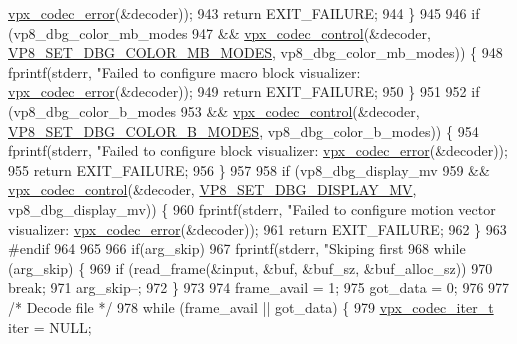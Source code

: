 \begin{DoxyCodeInclude}
{{{{{{{{{{{{{{{{{{{{{{{{{{{{{{{{{      \hyperlink{group__codec_ga4d265df00d42b36a4f0e3eb83fc22c5e}{vpx\_codec\_error}(&decoder));
943     \textcolor{keywordflow}{return} EXIT\_FAILURE;
944   \}
945 
946   \textcolor{keywordflow}{if} (vp8\_dbg\_color\_mb\_modes
947       && \hyperlink{group__codec_gac1b91e04698c1bd4c0a2b8aa85b08cd2}{vpx\_codec\_control}(&decoder, \hyperlink{group__vp8_gga8cadbc8e0af3da96ef7a2dbd4ed06599aa0d5c3eaa7cbecaf64403edc8450b060}{VP8\_SET\_DBG\_COLOR\_MB\_MODES},
       vp8\_dbg\_color\_mb\_modes)) \{
948     fprintf(stderr, \textcolor{stringliteral}{"Failed to configure macro block visualizer: %
      \hyperlink{group__codec_ga4d265df00d42b36a4f0e3eb83fc22c5e}{vpx\_codec\_error}(&decoder));
949     \textcolor{keywordflow}{return} EXIT\_FAILURE;
950   \}
951 
952   \textcolor{keywordflow}{if} (vp8\_dbg\_color\_b\_modes
953       && \hyperlink{group__codec_gac1b91e04698c1bd4c0a2b8aa85b08cd2}{vpx\_codec\_control}(&decoder, \hyperlink{group__vp8_gga8cadbc8e0af3da96ef7a2dbd4ed06599ae0052b9dd3c64a4bb822abafb4755a87}{VP8\_SET\_DBG\_COLOR\_B\_MODES}, 
      vp8\_dbg\_color\_b\_modes)) \{
954     fprintf(stderr, \textcolor{stringliteral}{"Failed to configure block visualizer: %
      \hyperlink{group__codec_ga4d265df00d42b36a4f0e3eb83fc22c5e}{vpx\_codec\_error}(&decoder));
955     \textcolor{keywordflow}{return} EXIT\_FAILURE;
956   \}
957 
958   \textcolor{keywordflow}{if} (vp8\_dbg\_display\_mv
959       && \hyperlink{group__codec_gac1b91e04698c1bd4c0a2b8aa85b08cd2}{vpx\_codec\_control}(&decoder, \hyperlink{group__vp8_gga8cadbc8e0af3da96ef7a2dbd4ed06599abc6aef0d7e0486d25348de217ad8441d}{VP8\_SET\_DBG\_DISPLAY\_MV}, 
      vp8\_dbg\_display\_mv)) \{
960     fprintf(stderr, \textcolor{stringliteral}{"Failed to configure motion vector visualizer: %
      \hyperlink{group__codec_ga4d265df00d42b36a4f0e3eb83fc22c5e}{vpx\_codec\_error}(&decoder));
961     \textcolor{keywordflow}{return} EXIT\_FAILURE;
962   \}
963 \textcolor{preprocessor}{#endif}
964 
965 
966   \textcolor{keywordflow}{if}(arg\_skip)
967     fprintf(stderr, \textcolor{stringliteral}{"Skiping first %
968   \textcolor{keywordflow}{while} (arg\_skip) \{
969     \textcolor{keywordflow}{if} (read\_frame(&input, &buf, &buf\_sz, &buf\_alloc\_sz))
970       \textcolor{keywordflow}{break};
971     arg\_skip--;
972   \}
973 
974   frame\_avail = 1;
975   got\_data = 0;
976 
977   \textcolor{comment}{/* Decode file */}
978   \textcolor{keywordflow}{while} (frame\_avail || got\_data) \{
979     \hyperlink{group__codec_ga6ea348f76b1f8a1fe50e14db684146c6}{vpx\_codec\_iter\_t}  iter = NULL;
}}}}}}}}}}}}}}}}}}}}}}}}}}}}}}}}}}}}}
\end{DoxyCodeInclude}
